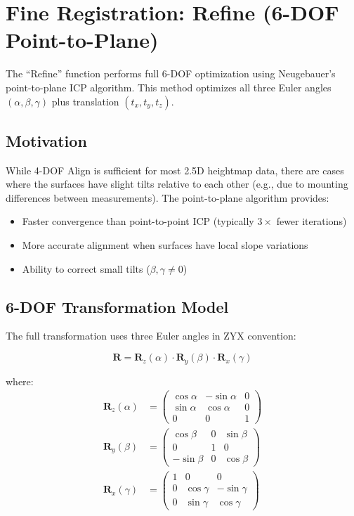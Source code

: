 \documentclass[11pt,a4paper]{article}
\begin{document}
\section{Fine Registration: Refine (6-DOF Point-to-Plane)}

The ``Refine'' function performs full 6-DOF optimization using Neugebauer's point-to-plane ICP algorithm. This method optimizes all three Euler angles $(\alpha, \beta, \gamma)$ plus translation $(t_x, t_y, t_z)$.

\subsection{Motivation}

While 4-DOF Align is sufficient for most 2.5D heightmap data, there are cases where the surfaces have slight tilts relative to each other (e.g., due to mounting differences between measurements). The point-to-plane algorithm provides:

\begin{itemize}
    \item Faster convergence than point-to-point ICP (typically $3\times$ fewer iterations)
    \item More accurate alignment when surfaces have local slope variations
    \item Ability to correct small tilts ($\beta, \gamma \neq 0$)
\end{itemize}

\subsection{6-DOF Transformation Model}

The full transformation uses three Euler angles in ZYX convention:

\begin{equation}
\mathbf{R} = \mathbf{R}_z(\alpha) \cdot \mathbf{R}_y(\beta) \cdot \mathbf{R}_x(\gamma)
\end{equation}

where:
\begin{align}
\mathbf{R}_z(\alpha) &= \begin{pmatrix} \cos\alpha & -\sin\alpha & 0 \\ \sin\alpha & \cos\alpha & 0 \\ 0 & 0 & 1 \end{pmatrix} \\[1em]
\mathbf{R}_y(\beta) &= \begin{pmatrix} \cos\beta & 0 & \sin\beta \\ 0 & 1 & 0 \\ -\sin\beta & 0 & \cos\beta \end{pmatrix} \\[1em]
\mathbf{R}_x(\gamma) &= \begin{pmatrix} 1 & 0 & 0 \\ 0 & \cos\gamma & -\sin\gamma \\ 0 & \sin\gamma & \cos\gamma \end{pmatrix}
\end{align}
\end{document}
